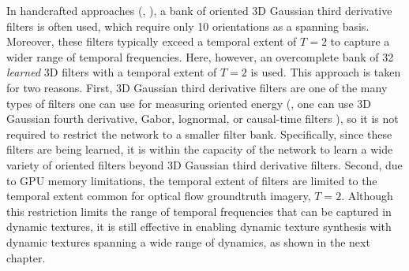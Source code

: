 In handcrafted approaches (\eg, \cite{derpanis2012spacetime}), a bank of oriented 3D Gaussian third derivative filters is often used, which require only 10 orientations as a spanning basis. Moreover, these filters typically exceed a temporal extent of $T=2$ to capture a wider range of temporal frequencies. Here, however, an overcomplete bank of 32 \emph{learned} 3D filters with a temporal extent of $T=2$ is used. This approach is taken for two reasons. First, 3D Gaussian third derivative filters are one of the many types of filters one can use for measuring oriented energy (\eg, one can use 3D Gaussian fourth derivative, Gabor, lognormal, or causal-time filters \cite{derpanis2010role}), so it is not required to restrict the network to a smaller filter bank. Specifically, since these filters are being learned, it is within the capacity of the network to learn a wide variety of oriented filters beyond 3D Gaussian third derivative filters. Second, due to GPU memory limitations, the temporal extent of filters are limited to the temporal extent common for optical flow groundtruth imagery, $T=2$. Although this restriction limits the range of temporal frequencies that can be captured in dynamic textures, it is still effective in enabling dynamic texture synthesis with dynamic textures spanning a wide range of dynamics, as shown in the next chapter.

